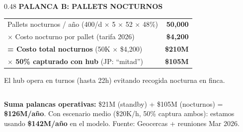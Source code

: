 \documentclass[aspectratio=169, 10pt]{beamer}
\begin{document}
\begin{frame}
\begin{columns}[T]
\begin{column}{0.48\textwidth}
{\tiny\color{cian}\textbf{PALANCA B: PALLETS NOCTURNOS}}
\vspace{2pt}

\tiny
\renewcommand{\arraystretch}{1.05}
\begin{tabular}{l r}
    \toprule
    Pallets nocturnos / a\~no (400/d $\times$ 5 $\times$ 52 $\times$ 48\%) & \textcolor{cian}{\textbf{50,000}} \\
    $\times$ Costo nocturno por pallet (tarifa 2026) & \textcolor{cian}{\textbf{\$4,200}} \\
    \midrule
    \textbf{= Costo total nocturnos} (50K $\times$ \$4,200) & \textcolor{cian}{\textbf{\$210M}} \\
    \rowcolor{verdeclaro}
    \textbf{$\times$ 50\% capturado con hub} (JP: ``mitad'') & \textcolor{cian}{\textbf{\$105M}} \\
    \bottomrule
\end{tabular}

\vspace{3pt}
{\tiny\color{gris} El hub opera en turnos (hasta 22h) evitando recogida nocturna en finca.}
\end{column}
\end{columns}

\vspace{4pt}
\colorbox{verdeclaro}{\parbox{\dimexpr\textwidth-12pt}{\scriptsize\strut
\textcolor{cian}{\textbf{Suma palancas operativas:}} \$21M (standby) + \$105M (nocturnos) = \textbf{\$126M/a\~no}.
Con escenario medio (\$20K/h, 50\% captura ambos): estamos usando \textbf{\$142M/a\~no} en el modelo.
Fuente: Geocercas + reuniones Mar 2026.\strut}}
\end{frame}
\end{document}
